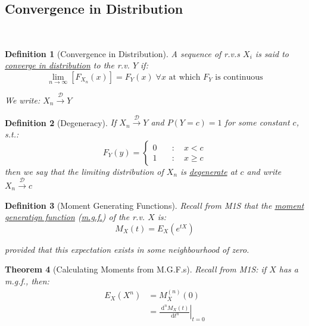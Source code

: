\documentclass[12pt,a4paper]{article}
\newcommand{\diff}{\;\mathrm{d}}
\newtheorem{thm}{Theorem}[subsection]
\newtheorem{defn}[thm]{Definition}
\begin{document}
\subsection{Convergence in Distribution}$\;$

\begin{defn}[Convergence in Distribution]\vspace{1cm}

A sequence of r.v.s $X_i$ is said to \underline{converge in distribution} to the r.v. $Y$ if:
$$\lim_{n\to\infty}\left[F_{X_n}(x)\right] = F_Y(x) \;\mbox{$\forall x$ at which $F_Y$ is continuous}$$

We write: $X_n \xrightarrow{\mathscr{D}}Y$

\end{defn}

\begin{defn}[Degeneracy]\vspace{1cm}

If $X_n \xrightarrow{\mathscr{D}} Y$ and $P(Y=c) = 1$ for some constant $c$, s.t.:
$$F_Y(y) = \left\{\begin{array}{cc} 0\quad &:\quad x<c\\ 1\quad&:\quad x\geq c \end{array}\right.$$
then we say that the limiting distribution of $X_n$ is \underline{degenerate} at $c$ and write $X_n \xrightarrow{\mathscr{D}} c$

\end{defn}

\begin{defn}[Moment Generating Functions]\vspace{1cm}

Recall from M1S that the \underline{moment generatign function} (\underline{m.g.f.}) of the r.v. $X$ is:
$$M_X(t) = E_X(e^{tX})$$

provided that this expectation exists in some neighbourhood of zero.

\end{defn}

\begin{thm}[Calculating Moments from M.G.F.s]\vspace{1cm}

Recall from M1S: if $X$ has a m.g.f., then:
\begin{align*}
E_X(X^n) &= M_X^{(n)}(0)\\
&= \left.\frac{\diff^n M_X(t)}{\diff t^n}\right|_{t=0}
\end{align*}

\end{thm}
\end{document}

